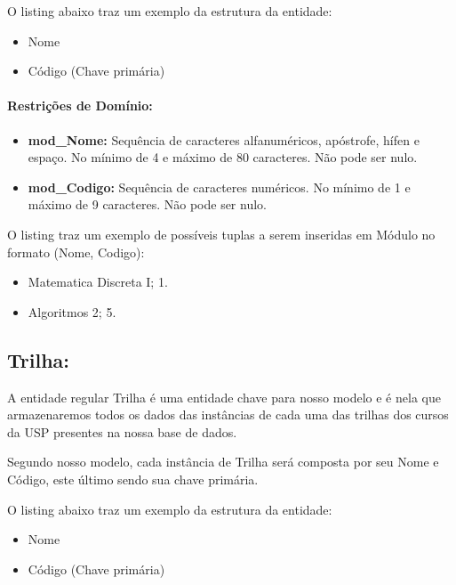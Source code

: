 \documentclass{report}
\begin{document}
	O listing abaixo traz um exemplo da estrutura da entidade:
\begin{itemize}
  \item Nome
  \item Código (Chave primária)
\end{itemize}
\paragraph{Restrições de Domínio:}
\begin{itemize}
  \item \textbf{mod\_Nome:} Sequência de caracteres alfanuméricos, apóstrofe, hífen e espaço. No mínimo de 4 e máximo de 80 caracteres. Não pode ser nulo.
  \item \textbf{mod\_Codigo:} Sequência de caracteres numéricos. No mínimo de 1 e máximo de 9 caracteres. Não pode ser nulo.
\end{itemize}
O listing traz um exemplo de possíveis tuplas a serem inseridas em Módulo no formato (Nome, Codigo):

\begin{itemize}
	\item Matematica Discreta I; 1. 
	\item Algoritmos 2; 5.
\end{itemize}
\subsection{Trilha:}
A entidade regular Trilha é uma entidade chave para nosso modelo e é nela que armazenaremos todos os dados das instâncias de cada uma das trilhas dos cursos da USP presentes na nossa base de dados.
	
	Segundo nosso modelo, cada instância de Trilha será composta por seu Nome e Código, este último sendo sua chave primária.
		
	O listing abaixo traz um exemplo da estrutura da entidade:
\begin{itemize}
  \item Nome
  \item Código (Chave primária)
\end{itemize}
\end{document}
